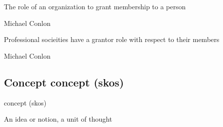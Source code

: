 \documentclass[letterpaper,10pt,english]{sphinxmanual}
\begin{document}
\begin{sphinxShadowBox}

\sphinxAtStartPar
The role of an organization to grant membership to a person
\end{sphinxShadowBox}

\begin{sphinxShadowBox}

\sphinxAtStartPar
Michael Conlon 
\end{sphinxShadowBox}

\begin{sphinxShadowBox}

\sphinxAtStartPar
Professional socieities have a grantor role with respect to their members
\end{sphinxShadowBox}

\begin{sphinxShadowBox}

\sphinxAtStartPar
Michael Conlon 
\end{sphinxShadowBox}
\begin{quote}

\ignorespaces \end{quote}


\subsection{Concept \sphinxhyphen{} concept (skos)}
\label{\detokenize{doc-Concept:concept-concept-skos}}\label{\detokenize{doc-Concept:index-0}}\label{\detokenize{doc-Concept::doc}}
\begin{sphinxShadowBox}

\sphinxAtStartPar
concept (skos)
\end{sphinxShadowBox}

\begin{sphinxShadowBox}

\sphinxAtStartPar
An idea or notion, a unit of thought
\end{sphinxShadowBox}
\end{document}

